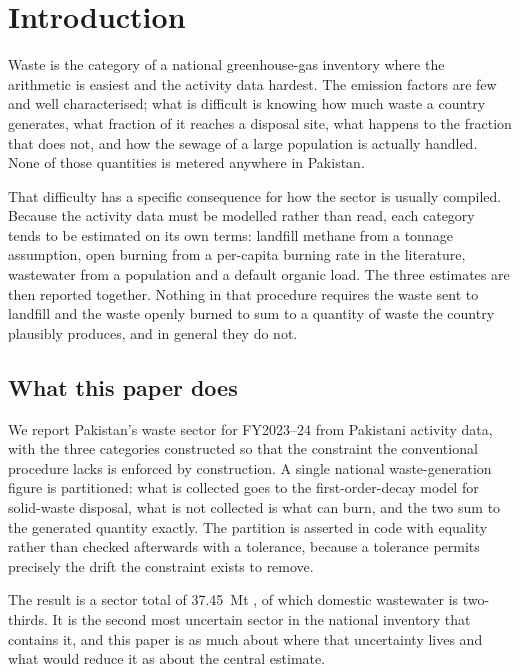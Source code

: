 \section{Introduction}
\label{sec:introduction}

Waste is the category of a national greenhouse-gas inventory where the arithmetic is easiest
and the activity data hardest. The emission factors are few and well characterised; what is
difficult is knowing how much waste a country generates, what fraction of it reaches a
disposal site, what happens to the fraction that does not, and how the sewage of a large
population is actually handled. None of those quantities is metered anywhere in Pakistan.

That difficulty has a specific consequence for how the sector is usually compiled. Because the
activity data must be modelled rather than read, each category tends to be estimated on its
own terms: landfill methane from a tonnage assumption, open burning from a per-capita burning
rate in the literature, wastewater from a population and a default organic load. The three
estimates are then reported together. Nothing in that procedure requires the waste sent to
landfill and the waste openly burned to sum to a quantity of waste the country plausibly
produces, and in general they do not.

\subsection{What this paper does}

We report Pakistan's waste sector for FY2023--24 from Pakistani activity data, with the three
categories constructed so that the constraint the conventional procedure lacks is enforced by
construction. A single national waste-generation figure is partitioned: what is collected
goes to the first-order-decay model for solid-waste disposal, what is not collected is what
can burn, and the two sum to the generated quantity exactly. The partition is asserted in code
with equality rather than checked afterwards with a tolerance, because a tolerance permits
precisely the drift the constraint exists to remove.

The result is a sector total of \SI{37.45}{\mega\tonne} \COe{}, of which domestic wastewater
is two-thirds. It is the second most uncertain sector in the national inventory that contains
it, and this paper is as much about where that uncertainty lives and what would reduce it as
about the central estimate.

